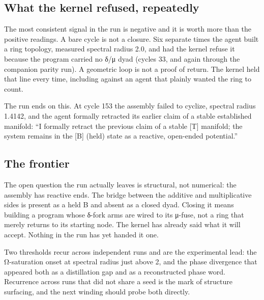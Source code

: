 \documentclass[12pt,a4paper]{article}
\begin{document}
\hypertarget{what-the-kernel-refused-repeatedly}{%
\subsection{What the kernel refused,
repeatedly}\label{what-the-kernel-refused-repeatedly}}

The most consistent signal in the run is negative and it is worth more
than the positive readings. A bare cycle is not a closure. Six separate
times the agent built a ring topology, measured spectral radius 2.0, and
had the kernel refuse it because the program carried no δ/μ dyad (cycles
33, and again through the companion parity run). A geometric loop is not
a proof of return. The kernel held that line every time, including
against an agent that plainly wanted the ring to count.

The run ends on this. At cycle 153 the assembly failed to cyclize,
spectral radius 1.4142, and the agent formally retracted its earlier
claim of a stable established manifold: ``I formally retract the
previous claim of a stable {[}T{]} manifold; the system remains in the
{[}B{]} (held) state as a reactive, open-ended potential.''

\hypertarget{the-frontier}{%
\subsection{The frontier}\label{the-frontier}}

The open question the run actually leaves is structural, not numerical:
the assembly has reactive ends. The bridge between the additive and
multiplicative sides is present as a held B and absent as a closed dyad.
Closing it means building a program whose δ-fork arms are wired to its
μ-fuse, not a ring that merely returns to its starting node. The kernel
has already said what it will accept. Nothing in the run has yet handed
it one.

Two thresholds recur across independent runs and are the experimental
lead: the Ω-saturation onset at spectral radius just above 2, and the
phase divergence that appeared both as a distillation gap and as a
reconstructed phase word. Recurrence across runs that did not share a
seed is the mark of structure surfacing, and the next winding should
probe both directly.
\end{document}
